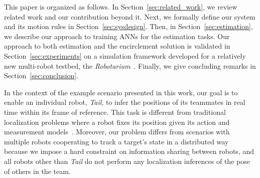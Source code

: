 \documentclass[letterpaper, 10 pt, conference]{ieeeconf}  %
\begin{document}
	
	This paper is organized as follows. In Section~\ref{sec:related_work},
	we review related work and our contribution beyond it. Next, we formally
	define our system and its motion rules in Section~\ref{sec:sysdesign}.
	Then, in Section~\ref{sec:estimation}, we describe our approach to
	training ANNs for the estimation tasks. Our approach to both estimation
	and the encirclement solution is validated in
	Section~\ref{sec:experiments} on a simulation framework developed for a
	relatively new multi-robot testbed, the
	\emph{Robotarium}~\cite{PWGDMAFE16}. Finally, we give concluding remarks
	in Section~\ref{sec:conclusion}.
	
	
	In the context of the example scenario presented in this work, our goal
	is to enable an individual robot, \emph{Tail}, to infer the positions of
	its teammates in real time within its frame of reference. This task is
	different from traditional localization problems where a robot fixes its
	position given its action and measurement models~\cite{Thrun05}.
	Moreover, our problem differs from scenarios with multiple robots
	cooperating to track a target's state in a distributed way~\cite{FSDO10,
		CX14, DMG15} because we impose a hard constraint on information sharing
	between robots, and all robots other than \emph{Tail} do not perform any
	localization inferences of the pose of others in the team.
	
\end{document}
